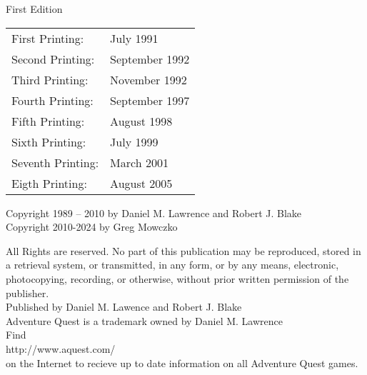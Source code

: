 First Edition

\vspace*{1cm}
\begin{tabular}{ l l }
First Printing: & July 1991\\
Second Printing: & September 1992\\
Third Printing: & November 1992\\
Fourth Printing: & September 1997\\
Fifth Printing: & August 1998\\
Sixth Printing: & July 1999\\
Seventh Printing: & March 2001\\
Eigth Printing: & August 2005
\end{tabular}

\vspace*{1cm}
Copyright 1989 – 2010 by Daniel M. Lawrence and Robert J. Blake\\
Copyright 2010-2024 by Greg Mowczko

\vspace*{0.5cm}
All Rights are reserved. No part of this publication may be reproduced, stored in a retrieval system, or transmitted, in any form, or by any means, electronic, photocopying, recording,
or otherwise, without prior written permission of the publisher.\\

\vspace*{1cm}
Published by Daniel M. Lawence and Robert J. Blake\\
Adventure Quest is a trademark owned by Daniel M. Lawrence\\

\vspace*{1cm}
Find\\
http://www.aquest.com/\\
on the Internet to recieve up to date information on all Adventure Quest games.